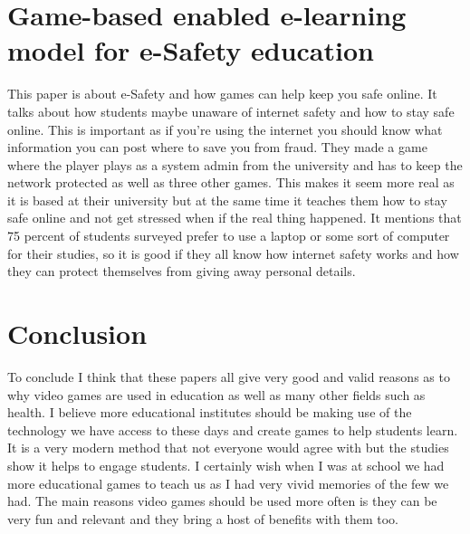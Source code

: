 \documentclass{scrartcl}
\begin{document}
\section{Game-based enabled e-learning model for e-Safety education \cite{underhay2016game} }
This paper is about e-Safety and how games can help keep you safe online. It talks about how students maybe unaware of internet safety and how to stay safe online. This is important as if you're using the internet you should know what information you can post where to save you from fraud. They made a game where the player plays as a system admin from the university and has to keep the network protected as well as three other games. This makes it seem more real as it is based at their university but at the same time it teaches them how to stay safe online and not get stressed when if the real thing happened. It mentions that 75 percent of students surveyed prefer to use a laptop or some sort of computer for their studies, so it is good if they all know how internet safety works and how they can protect themselves from giving away personal details.
\section{Conclusion}
To conclude I think that these papers all give very good and valid reasons as to why video games are used in education as well as many other fields such as health. I believe more educational institutes should be making use of the technology we have access to these days and create games to help students learn. It is a very modern method that not everyone would agree with but the studies show it helps to engage students. I certainly wish when I was at school we had more educational games to teach us as I had very vivid memories of the few we had. The main reasons video games should be used more often is they can be very fun and relevant and they bring a host of benefits with them too.



\end{document}
